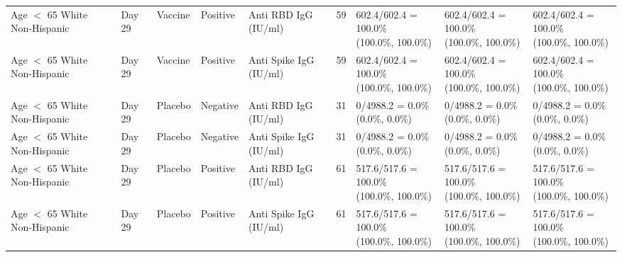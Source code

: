 \documentclass[]{book}
\theoremstyle{definition}
\theoremstyle{definition}
\theoremstyle{definition}
\newcommand{\1}{\mathbbm{1}}
\begin{document}
\begin{landscape}
\begin{ThreePartTable}
\begin{longtable}[t]{>{\raggedright\arraybackslash}p{2.7cm}llllllll}
\hspace{1em}Age $<$ 65 White Non-Hispanic & Day 29 & Vaccine & Positive & Anti RBD IgG (IU/ml) & 59 & \makecell[l]{602.4/602.4 = 100.0\%\\(100.0\%, 100.0\%)} & \makecell[l]{602.4/602.4 = 100.0\%\\(100.0\%, 100.0\%)} & \makecell[l]{602.4/602.4 = 100.0\%\\(100.0\%, 100.0\%)}\\
\hspace{1em}Age $<$ 65 White Non-Hispanic & Day 29 & Vaccine & Positive & Anti Spike IgG (IU/ml) & 59 & \makecell[l]{602.4/602.4 = 100.0\%\\(100.0\%, 100.0\%)} & \makecell[l]{602.4/602.4 = 100.0\%\\(100.0\%, 100.0\%)} & \makecell[l]{602.4/602.4 = 100.0\%\\(100.0\%, 100.0\%)}\\
\hspace{1em}Age $<$ 65 White Non-Hispanic & Day 29 & Placebo & Negative & Anti RBD IgG (IU/ml) & 31 & \makecell[l]{0/4988.2 = 0.0\%\\(0.0\%, 0.0\%)} & \makecell[l]{0/4988.2 = 0.0\%\\(0.0\%, 0.0\%)} & \makecell[l]{0/4988.2 = 0.0\%\\(0.0\%, 0.0\%)}\\
\hspace{1em}Age $<$ 65 White Non-Hispanic & Day 29 & Placebo & Negative & Anti Spike IgG (IU/ml) & 31 & \makecell[l]{0/4988.2 = 0.0\%\\(0.0\%, 0.0\%)} & \makecell[l]{0/4988.2 = 0.0\%\\(0.0\%, 0.0\%)} & \makecell[l]{0/4988.2 = 0.0\%\\(0.0\%, 0.0\%)}\\
\hspace{1em}Age $<$ 65 White Non-Hispanic & Day 29 & Placebo & Positive & Anti RBD IgG (IU/ml) & 61 & \makecell[l]{517.6/517.6 = 100.0\%\\(100.0\%, 100.0\%)} & \makecell[l]{517.6/517.6 = 100.0\%\\(100.0\%, 100.0\%)} & \makecell[l]{517.6/517.6 = 100.0\%\\(100.0\%, 100.0\%)}\\
\hspace{1em}Age $<$ 65 White Non-Hispanic & Day 29 & Placebo & Positive & Anti Spike IgG (IU/ml) & 61 & \makecell[l]{517.6/517.6 = 100.0\%\\(100.0\%, 100.0\%)} & \makecell[l]{517.6/517.6 = 100.0\%\\(100.0\%, 100.0\%)} & \makecell[l]{517.6/517.6 = 100.0\%\\(100.0\%, 100.0\%)}\\

\end{longtable}
\end{ThreePartTable}
\end{landscape}
\end{document}
